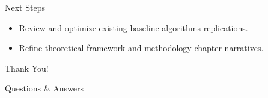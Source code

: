 \documentclass[11pt, aspectratio=169]{beamer}
\begin{document}
\begin{frame}{Next Steps}
    \begin{itemize}
        \item Review and optimize existing baseline algorithms replications.
        \item Refine theoretical framework and methodology chapter narratives.
    \end{itemize}
\end{frame}

\begin{frame}[standout]
    Thank You!
    \vspace{0.5cm}
    \begin{center}
        \large Questions \& Answers
    \end{center}
\end{frame}
\end{document}
